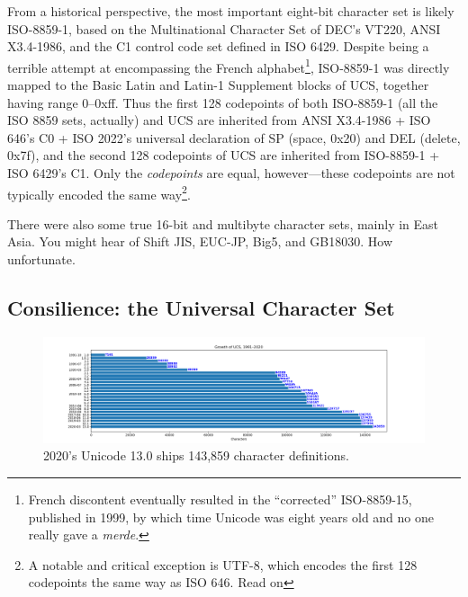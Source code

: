 From a historical perspective, the most important eight-bit character set
is likely ISO-8859-1\cite{iso8859}, based on the Multinational Character Set
of DEC's VT220, ANSI X3.4-1986, and the C1 control code set defined in ISO 6429.
Despite being a terrible attempt at encompassing the French alphabet\footnote{French
discontent eventually resulted in the ``corrected'' ISO-8859-15, published in
1999, by which time Unicode was eight years old and no one really gave a \textit{merde}\cite{french}.},
ISO-8859-1 was directly mapped to the Basic Latin and Latin-1 Supplement blocks
of UCS, together having range 0--0xff. Thus the first 128 codepoints of both 
ISO-8859-1 (all the ISO 8859 sets, actually) and UCS are inherited from ANSI
X3.4-1986 + ISO 646's C0 + ISO 2022's universal declaration of SP (space, 0x20) and
DEL (delete, 0x7f), and the second 128 codepoints of UCS are inherited
from ISO-8859-1 + ISO 6429's C1. Only the \textit{codepoints} are equal,
however---these codepoints are not typically encoded the same way\footnote{A
notable and critical exception is UTF-8, which encodes the first 128 codepoints
the same way as ISO 646. Read on\textellipsis}.

There were also some true 16-bit and multibyte character sets, mainly in East
Asia. You might hear of Shift JIS, EUC-JP, Big5, and GB18030. How unfortunate.

\subsection{Consilience: the Universal Character Set}
\label{sec:ucs}
\begin{figure}[!htb]
  \centering
  \includegraphics[width=1.1\linewidth]{media/unicode-growth.png}
  \caption{2020's Unicode 13.0 ships 143,859 character definitions.}
  \label{fig:unicodegrowth}
\end{figure}

